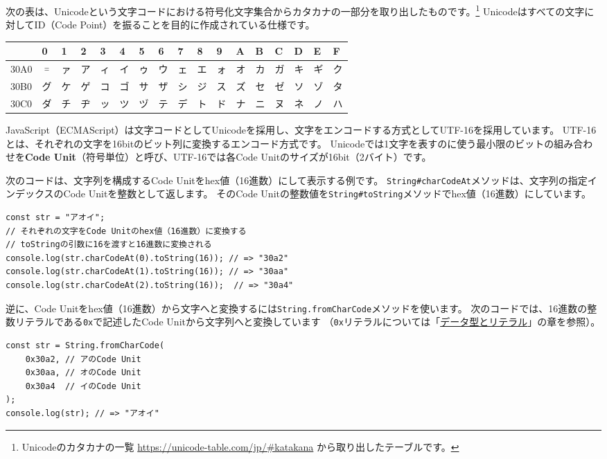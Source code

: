 次の表は、Unicodeという文字コードにおける符号化文字集合からカタカナの一部分を取り出したものです。\footnote{Unicodeのカタカナの一覧
  \url{https://unicode-table.com/jp/\#katakana}
  から取り出したテーブルです。} Unicodeはすべての文字に対してID（Code
Point）を振ることを目的に作成されている仕様です。

\begin{longtable}[]{@{}lllllllllllllllll@{}}
\toprule
& 0 & 1 & 2 & 3 & 4 & 5 & 6 & 7 & 8 & 9 & A & B & C & D & E &
F\tabularnewline
\midrule
\endhead
30A0 & ゠ & ァ & ア & ィ & イ & ゥ & ウ & ェ & エ & ォ & オ & カ & ガ &
キ & ギ & ク\tabularnewline
30B0 & グ & ケ & ゲ & コ & ゴ & サ & ザ & シ & ジ & ス & ズ & セ & ゼ &
ソ & ゾ & タ\tabularnewline
30C0 & ダ & チ & ヂ & ッ & ツ & ヅ & テ & デ & ト & ド & ナ & ニ & ヌ &
ネ & ノ & ハ\tabularnewline
\bottomrule
\end{longtable}

JavaScript（ECMAScript）は文字コードとしてUnicodeを採用し、文字をエンコードする方式としてUTF-16を採用しています。
UTF-16とは、それぞれの文字を16bitのビット列に変換するエンコード方式です。
Unicodeでは1文字を表すのに使う最小限のビットの組み合わせを\textbf{Code
Unit}（符号単位）と呼び、UTF-16では各Code
Unitのサイズが16bit（2バイト）です。

次のコードは、文字列を構成するCode
Unitをhex値（16進数）にして表示する例です。
\texttt{String\#charCodeAt}メソッドは、文字列の指定インデックスのCode
Unitを整数として返します。 そのCode
Unitの整数値を\texttt{String\#toString}メソッドでhex値（16進数）にしています。

\begin{lstlisting}
const str = "アオイ";
// それぞれの文字をCode Unitのhex値（16進数）に変換する
// toStringの引数に16を渡すと16進数に変換される
console.log(str.charCodeAt(0).toString(16)); // => "30a2"
console.log(str.charCodeAt(1).toString(16)); // => "30aa"
console.log(str.charCodeAt(2).toString(16));  // => "30a4"
\end{lstlisting}

逆に、Code
Unitをhex値（16進数）から文字へと変換するには\texttt{String.fromCharCode}メソッドを使います。
次のコードでは、16進数の整数リテラルである\texttt{0x}で記述したCode
Unitから文字列へと変換しています
（\texttt{0x}リテラルについては「\href{../data-type/README.md}{データ型とリテラル}」の章を参照）。

\begin{lstlisting}
const str = String.fromCharCode(
    0x30a2, // アのCode Unit
    0x30aa, // オのCode Unit
    0x30a4  // イのCode Unit
);
console.log(str); // => "アオイ"
\end{lstlisting}

